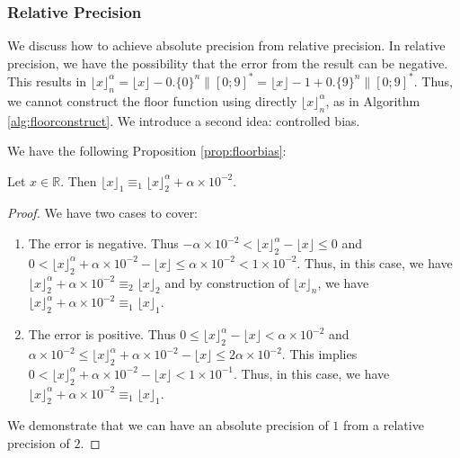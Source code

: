 \documentclass[runningheads]{llncs}
\begin{document}
\subsubsection{Relative Precision}
We discuss how to achieve absolute precision from relative precision. In relative precision, we have the possibility that the error from the result can be negative. This results in $\lfloor x \rfloor_n^\alpha = \lfloor x \rfloor - 0.\{0\}^{n}\|[0;9]^*=\lfloor x \rfloor-1 + 0.\{9\}^{n}\|[0;9]^* $. Thus, we cannot construct the floor function using directly $\lfloor x \rfloor_n^\alpha$, as in Algorithm \ref{alg:floorconstruct}. We introduce a second idea: controlled bias.

\medskip

\noindent We have the following Proposition \ref{prop:floorbias}:
\begin{proposition}\label{prop:floorbias}
  Let $x\in\mathbb{R}$. Then $\lfloor x\rfloor_1 \equiv_1 \lfloor x \rfloor_2^\alpha + \alpha\times10^{-2}$.
\end{proposition}
\begin{proof}
  We have two cases to cover: \begin{enumerate}
    \item The error is negative. Thus $-\alpha\times 10^{-2} < \lfloor x \rfloor_2^\alpha - \lfloor x \rfloor \leq 0$ and $0 < \lfloor x \rfloor_2^\alpha + \alpha\times 10^{-2} - \lfloor x \rfloor \leq \alpha\times 10^{-2} < 1\times 10^{-2}$. Thus, in this case, we have $\lfloor x \rfloor_2^\alpha + \alpha\times 10^{-2} \equiv_2 \lfloor x \rfloor_2$ and by construction of $\lfloor x \rfloor_n$, we have $\lfloor x \rfloor_2^\alpha + \alpha\times 10^{-2} \equiv_1 \lfloor x \rfloor_1$.
    \item The error is positive. Thus $0 \leq \lfloor x \rfloor_2^\alpha - \lfloor x \rfloor < \alpha\times10^{-2}$ and $\alpha\times10^{-2} \leq \lfloor x \rfloor_2^\alpha + \alpha\times 10^{-2} - \lfloor x \rfloor \leq 2\alpha\times 10^{-2}$. This implies $0<\lfloor x \rfloor_2^\alpha + \alpha\times 10^{-2} - \lfloor x \rfloor<1\times10^{-1}$. Thus, in this case, we have $\lfloor x \rfloor_2^\alpha + \alpha\times 10^{-2} \equiv_1 \lfloor x \rfloor_1$.
  \end{enumerate}
  We demonstrate that we can have an absolute precision of $1$ from a relative precision of $2$.
\end{proof}
\end{document}
